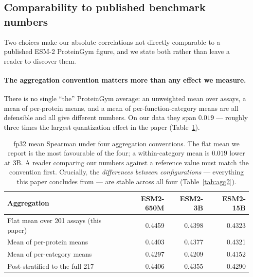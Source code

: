 \documentclass[11pt]{article}
\begin{document}
\subsection{Comparability to published benchmark numbers}
\label{sec:comparability}

Two choices make our absolute correlations not directly comparable to a
published ESM-2 ProteinGym figure, and we state both rather than leave a reader
to discover them.

\paragraph{The aggregation convention matters more than any effect we measure.}
There is no single ``the'' ProteinGym average: an unweighted mean over assays,
a mean of per-protein means, and a mean of per-function-category means are all
defensible and all give different numbers. On our data they span $0.019$ ---
roughly three times the largest quantization effect in the paper
(Table~\ref{tab:agg}).

\begin{table}[htb]
\centering
\caption{fp32 mean Spearman under four aggregation conventions. The flat mean we
report is the most favourable of the four; a within-category mean is $0.019$
lower at 3B. A reader comparing our numbers against a reference value must match
the convention first. Crucially, the \emph{differences between configurations}
--- everything this paper concludes from --- are stable across all four
(Table~\ref{tab:agg2}).}
\label{tab:agg}
\small
\begin{tabular}{lrrr}
\toprule
Aggregation & ESM2-650M & ESM2-3B & ESM2-15B \\
\midrule
Flat mean over 201 assays (this paper) & 0.4459 & 0.4398 & 0.4323 \\
Mean of per-protein means              & 0.4403 & 0.4377 & 0.4321 \\
Mean of per-category means             & 0.4297 & 0.4209 & 0.4152 \\
Post-stratified to the full 217        & 0.4406 & 0.4355 & 0.4290 \\
\bottomrule
\end{tabular}
\end{table}
\end{document}
